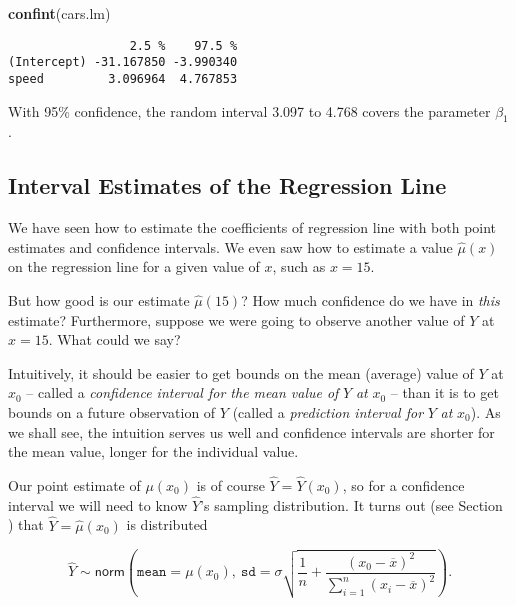 \documentclass[]{book}
\newenvironment{Shaded}{\begin{snugshade}}{\end{snugshade}}
\newcommand{\KeywordTok}[1]{\textcolor[rgb]{0.13,0.29,0.53}{\textbf{{#1}}}}
\newcommand{\NormalTok}[1]{{#1}}
\numberwithin{equation}{chapter}
\numberwithin{figure}{chapter}
\theoremstyle{plain}
\theoremstyle{definition}
\theoremstyle{remark}
\theoremstyle{definition}
\theoremstyle{definition}
\theoremstyle{remark}
\begin{document}
\begin{Shaded}
\begin{Highlighting}[]
\KeywordTok{confint}\NormalTok{(cars.lm)}
\end{Highlighting}
\end{Shaded}

\begin{verbatim}
                 2.5 %    97.5 %
(Intercept) -31.167850 -3.990340
speed         3.096964  4.767853
\end{verbatim}

With 95\% confidence, the random interval 3.097 to 4.768 covers the
parameter \(\beta_{1}\).

\subsection{Interval Estimates of the Regression
Line}\label{sub-slr-interval-est-regline}

We have seen how to estimate the coefficients of regression line with
both point estimates and confidence intervals. We even saw how to
estimate a value \(\hat{\mu}(x)\) on the regression line for a given
value of \(x\), such as \(x=15\).

But how good is our estimate \(\hat{\mu}(15)\)? How much confidence do
we have in \emph{this} estimate? Furthermore, suppose we were going to
observe another value of \(Y\) at \(x=15\). What could we say?

Intuitively, it should be easier to get bounds on the mean (average)
value of \(Y\) at \(x_{0}\) -- called a \emph{confidence interval for
the mean value of} \(Y\) \emph{at} \(x_{0}\) -- than it is to get bounds
on a future observation of \(Y\) (called a \emph{prediction interval
for} \(Y\) \emph{at} \(x_{0}\)). As we shall see, the intuition serves
us well and confidence intervals are shorter for the mean value, longer
for the individual value.

Our point estimate of \(\mu(x_{0})\) is of course
\(\hat{Y}=\hat{Y}(x_{0})\), so for a confidence interval we will need to
know \(\hat{Y}\)'s sampling distribution. It turns out (see Section )
that \(\hat{Y}=\hat{\mu}(x_{0})\) is distributed

\begin{equation}
\hat{Y}\sim\mathsf{norm}\left(\mathtt{mean}=\mu(x_{0}),\:\mathtt{sd}=\sigma\sqrt{\frac{1}{n}+\frac{(x_{0}-\overline{x})^{2}}{\sum_{i=1}^{n}(x_{i}-\overline{x})^{2}}}\right).
\end{equation}
\end{document}
